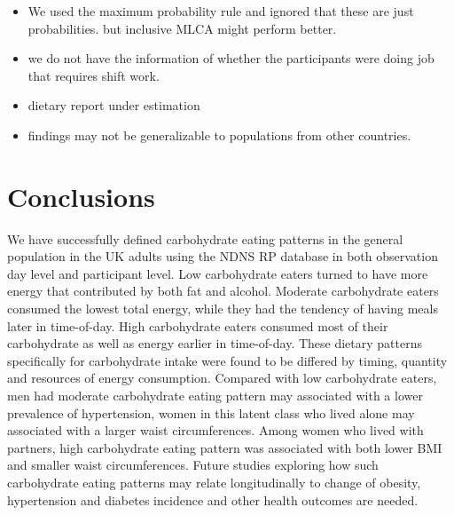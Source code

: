 \begin{itemize}
	\item We used the maximum probability rule and ignored that these are just probabilities. but inclusive MLCA might perform better.
	\item we do not have the information of whether the participants were doing job that requires shift work.
	\item dietary report under estimation
	\item findings may not be generalizable to populations from other countries.
\end{itemize}



\section{Conclusions}

We have successfully defined carbohydrate eating patterns in the general population in the UK adults using the NDNS RP database in both observation day level and participant level. Low carbohydrate eaters turned to have more energy that contributed by both fat and alcohol. Moderate carbohydrate eaters consumed the lowest total energy, while they had the tendency of having meals later in time-of-day. High carbohydrate eaters consumed most of their carbohydrate as well as energy earlier in time-of-day. These dietary patterns specifically for carbohydrate intake were found to be differed by timing, quantity and resources of energy consumption. Compared with low carbohydrate eaters, men had moderate carbohydrate eating pattern may associated with a lower prevalence of hypertension, women in this latent class who lived alone may associated with a larger waist circumferences. Among women who lived with partners, high carbohydrate eating pattern was associated with both lower BMI and smaller waist circumferences. Future studies exploring how such carbohydrate eating patterns may relate longitudinally to change of obesity, hypertension and diabetes incidence and other health outcomes are needed.